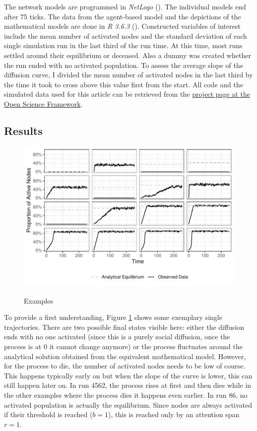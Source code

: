 \documentclass[a4paper,12pt]{article}
\begin{document}
The network models are programmed in \textit{NetLogo} (\cite{wilenskyNetLogo1999}\nocite{wilenskyNetLogoSmallWorlds2005}). The individual models end after 75 ticks. The data from the agent-based model and the depictions of the mathematical models are done in \textit{R 3.6.3} (\cite{rcoreteamLanguageEnvironmentStatistical2020}\nocite{wickhamGgplot2ElegantGraphics2009}). Constructed variables of interest include the mean number of activated nodes and the standard deviation of each single simulation run in the last third of the run time. At this time, most runs settled around their equilibrium or deceased. Also a dummy was created whether the run ended with no activated population. To assess the average slope of the diffusion curve, I divided the mean number of activated nodes in the last third by the time it took to cross above this value first from the start. All code and the simulated data used for this article can be retrieved from the \href{https://osf.io/ykhdv/}{project page at the Open Science Framework}.

\subsection{Results}

\begin{figure}
\caption{Examples}
\centering
\includegraphics[width=\linewidth]{images/example_runs.pdf}
\label{fig:examples}
\end{figure}

To provide a first understanding, Figure \ref{fig:examples} shows some exemplary single trajectories. There are two possible final states visible here: either the diffusion ends with no one activated (since this is a purely social diffusion, once the process is at 0 it cannot change anymore) or the process fluctuates around the analytical solution obtained from the equivalent mathematical model. However, for the process to die, the number of activated nodes needs to be low of course. This happens typically early on but when the slope of the curve is lower, this can still happen later on. In run 4562, the process rises at first and then dies while in the other examples where the process dies it happens even earlier. In run 86, no activated population is actually the equilibrium. Since nodes are always activated if their threshold is reached ($b = 1$), this is reached only by an attention span $r = 1$. 
\end{document}
